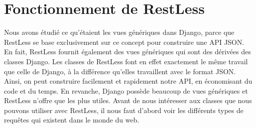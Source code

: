 \documentclass[a4paper,10pt,twoside]{sphinxmanual}
\begin{document}
\section{Fonctionnement de RestLess}
\label{restless:fonctionnement-de-restless}
Nous avons étudié ce qu'étaient les vues génériques dans Django, parce que RestLess se base exclusivement sur ce concept pour construire une API JSON. En fait, RestLess fournit également des vues génériques qui sont des dérivées des classes Django. Les classes de RestLess font en effet exactement le même travail que celle de Django, à la différence qu'elles travaillent avec le format JSON. Ainsi, on peut construire facilement et rapidement notre API, en économisant du code et du temps. En revanche, Django possède beaucoup de vues génériques et RestLess n'offre que les plus utiles. Avant de nous intéresser aux classes que nous pouvons utiliser avec RestLess, il nous faut d'abord voir les différents types de requêtes qui existent dans le monde du web.
\end{document}
